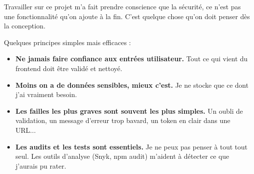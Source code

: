 Travailler sur ce projet m'a fait prendre conscience que la sécurité, ce n'est pas une fonctionnalité qu'on ajoute à la fin. C'est quelque chose qu'on doit penser dès la conception.

Quelques principes simples mais efficaces :
\begin{itemize}
    \item \textbf{Ne jamais faire confiance aux entrées utilisateur.} Tout ce qui vient du frontend doit être validé et nettoyé.
    \item \textbf{Moins on a de données sensibles, mieux c'est.} Je ne stocke que ce dont j'ai vraiment besoin.
    \item \textbf{Les failles les plus graves sont souvent les plus simples.} Un oubli de validation, un message d'erreur trop bavard, un token en clair dans une URL...
    \item \textbf{Les audits et les tests sont essentiels.} Je ne peux pas penser à tout tout seul. Les outils d'analyse (Snyk, npm audit) m'aident à détecter ce que j'aurais pu rater.
\end{itemize}